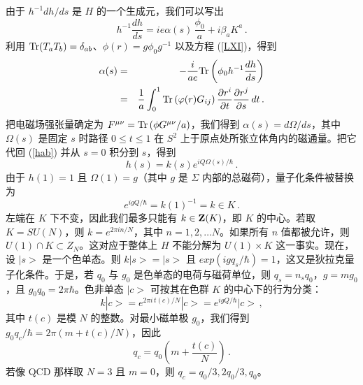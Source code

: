 由于 $h^{-1} dh/ds$ 是 $H$ 的一个生成元，我们可以写出
\begin{equation}
h^{-1} \frac{dh}{ds}=ie\alpha (s)\,\frac{\phi_0}{a} +
i \beta_{a} K^{a} \,.
\label{hab}
\end{equation}
利用 ${\rm Tr}(T_a T_b)=\delta_{ab}$、$\phi(r)=g\phi_0 g^{-1}$ 以及方程 (\ref{LXI})，得到
\begin{eqnarray}
\alpha (s)&=&-\frac{i}{ae}{\rm Tr}\left(\phi_0 h^{-1}\frac{dh}{ds} 
\right) \nonumber \\
&=&\frac{1}{a} \int^{1}_{0}{\rm Tr} \left(\varphi (r) G_{ij}\right) 
\frac{\partial r^i}{\partial t}\frac{\partial r^j}{\partial s}\,dt\,.
\nonumber
\end{eqnarray}
把电磁场强张量确定为 $F^{\mu\nu}={\rm Tr}\,(\phi G^{\mu\nu}/a)$，我们得到 $\alpha(s)= d\Omega/ds$，其中 $\Omega(s)$ 是固定 $s$ 时路径 $0\leq t\leq 1$ 在 $S^2$ 上于原点处所张立体角内的磁通量。把它代回 (\ref{hab}) 并从 $s=0$ 积分到 $s$，得到
$$
h(s)= k(s) e^{i Q \Omega(s) / \hbar}\,.
$$
由于 $h(1)=1$ 且 $\Omega (1) = g$（其中 $g$ 是 $\Sigma$ 内部的总磁荷），量子化条件被替换为
$$
e^{igQ/\hbar} = k(1)^{-1}=k \in K \,.
$$
左端在 $K$ 下不变，因此我们最多只能有 $k\in {\bf Z}(K)$，即 $K$ 的中心。若取 $K = SU(N)$，则 $k=e^{2\pi in/N}$，其中 $n=1,2,\dots N$。如果所有 $n$ 值都被允许，则 $U(1)\cap K\subset Z_{N}$。这对应于整体上 $H$ 不能分解为 $U(1)\times K$ 这一事实。现在，设 $|s>$ 是一个色单态。则 $k|s> = |s>$ 且 $exp(igq_s/\hbar)=1$，这又是狄拉克量子化条件。于是，若 $q_0$ 与 $g_0$ 是色单态的电荷与磁荷单位，则 $q_s=n_sq_0$，$g=mg_0$，且 $g_0q_0=2\pi\hbar$。色非单态 $|c>$ 可按其在色群 $K$ 的中心下的行为分类：
$$
k|c> = e^{2\pi i \, t(c)/N} |c> =e^{igQ / \hbar} |c>\,,
$$
其中 $t(c)$ 是模 $N$ 的整数。对最小磁单极 $g_{0}$，我们得到 $g_0 q_c /\hbar=2\pi(m + t(c)/N) $，因此
$$
q_c = q_0 (m + \frac{t(c)}{N})\,. 
$$
若像 QCD 那样取 $N=3$ 且 $m=0$，则 $q_c=q_0/3, 2q_0/3,q_0$。

